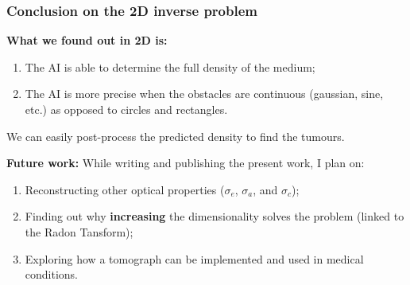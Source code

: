 \begin{frame}
  \frametitle{Conclusion on the 2D inverse problem}
  \begin{alertblock}{\textbf{What we found out in 2D is:}}
    \begin{enumerate}
      \item The AI is able to determine the full density of the medium;
      \item The AI is more precise when the obstacles are continuous (gaussian, sine, etc.) as opposed to circles and rectangles.
    \end{enumerate}
    We can easily post-process the predicted density to find the tumours.
  \end{alertblock}

  \pause

  \begin{alertblock}{\textbf{Future work:}}
    While writing and publishing the present work, I plan on:
    \begin{enumerate}
      \item Reconstructing other optical properties ($\sigma_e$, $\sigma_a$, and $\sigma_c$);
      \item Finding out why \textbf{increasing} the dimensionality solves the problem (linked to the Radon Tansform);
      \item Exploring how a tomograph can be implemented and used in medical conditions.
    \end{enumerate}
  \end{alertblock}

\end{frame}


